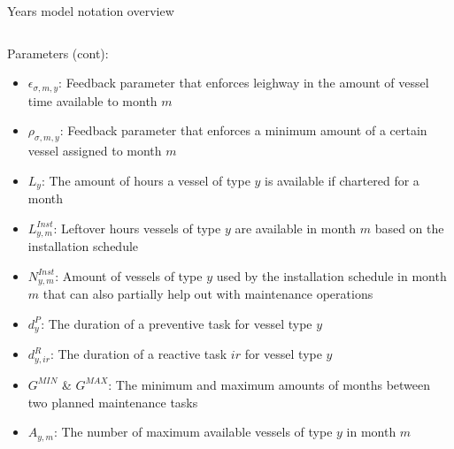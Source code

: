 \documentclass{beamer}
\begin{document}
\begin{frame}{Years model notation overview}
\begin{columns}
\begin{column}{.48\textwidth}
Parameters (cont):
\begin{itemize}
\item $\epsilon_{\sigma, m, y}$: Feedback parameter that enforces leighway in the amount of vessel time available to month $m$
\item $\rho_{ \sigma, m, y}$: Feedback parameter that enforces a minimum amount of a certain vessel assigned to month $m$
\item $L_y$: The amount of hours a vessel of type $y$ is available if chartered for a month
\item $L^{Inst}_{y,m}$: Leftover hours vessels of type $y$ are available in month $m$ based on the installation schedule
\item $N^{Inst}_{y,m}$: Amount of vessels of type $y$ used by the installation schedule in month $m$ that can also partially help out with maintenance operations
\item $d^P_y$: The duration of a preventive task for vessel type $y$
\item $d^R_{y,ir}$: The duration of a reactive task $ir$ for vessel type $y$
\item $G^{MIN}$ \& $G^{MAX}$: The minimum and maximum amounts of months between two planned maintenance tasks
\item $A_{y,m}$: The number of maximum available vessels of type $y$ in month $m$
\end{itemize}
\end{column}
\end{columns}
\end{frame}

\end{document}
